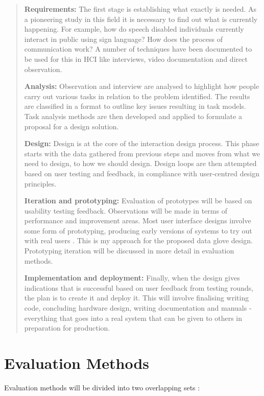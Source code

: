 \begin{quote}
\textbf{Requirements:} The first stage is establishing what exactly is needed. As a pioneering study in this field it is necessary to find out what is currently happening. For example, how do speech disabled individuals currently interact in public using sign language? How does the process of communication work? 
A number of techniques have been documented to be used for this in HCI \parencite{Dix2004}  \parencite{Zimmerman:2007:RTD:1240624.1240704} like interviews, video documentation and direct observation.
 
\textbf{Analysis:} Observation and interview are analysed to highlight how people carry out various tasks in relation to the problem identified. The results are classified in a format to outline key issues resulting in task models. Task analysis methods are then developed and applied to formulate a proposal for a design solution. 

\textbf{Design:} Design is at the core of the interaction design process. This phase starts with the data gathered from previous steps and moves from what we need to design, to how we should design. Design loops are then attempted based on user testing and feedback, in compliance with user-centred design principles. 

\textbf{Iteration and prototyping:} Evaluation of prototypes will be based on usability testing feedback. Observations will be made in terms of performance and improvement areas. Most user interface designs involve some form of prototyping, producing early versions of systems to try out with real users \parencite{Bevan1999}. This is my approach for the proposed data glove design. Prototyping iteration will be discussed in more detail in evaluation methods. 

\textbf{Implementation and deployment:} Finally, when the design gives indications that is successful based on user feedback from testing rounds, the plan is to create it and deploy it. This will involve finalising writing code, concluding hardware design, writing documentation and manuals - everything that goes into a real system that can be given to others in preparation for production. 
\end{quote}

\section{Evaluation Methods}

Evaluation methods will be divided into two overlapping sets \parencite{Fallman2005}:

